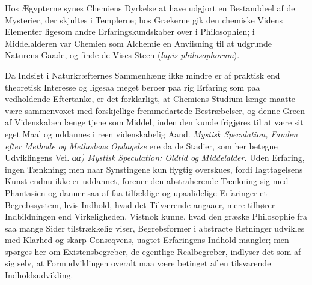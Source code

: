 \documentclass[12pt,a4paper]{book}
\begin{document}
Hos Ægypterne synes Chemiens Dyrkelse at have udgjort
en Bestanddeel af de Mysterier, der skjultes i Templerne;
hos Grækerne gik den chemiske Videns Elementer ligesom
andre Erfaringskundskaber over i Philosophien; i Middelalderen
var Chemien som Alchemie en Anviisning til at udgrunde
Naturens Gaade, og finde de Vises Steen (\textit{lapis
philosophorum}).

Da Indsigt i Naturkræfternes Sammenhæng ikke mindre
er af praktisk end theoretisk Interesse og ligesaa meget beroer
paa rig Erfaring som paa vedholdende Eftertanke, er det
forklarligt, at Chemiens Studium længe maatte være sammenvoxet
med forskjellige fremmedartede Bestræbelser, og denne
Green af Videnskaben længe tjene som Middel, inden den
kunde frigjøres til at være sit eget Maal og uddannes i reen
videnskabelig Aand. \emph{Mystisk Speculation, Famlen
efter Methode og Methodens Opdagelse} ere da de
Stadier, som her betegne Udviklingens Vei.
\emph{αα) Mystisk Speculation: Oldtid og Middelalder.}
Uden Erfaring, ingen Tænkning; men naar Synstingene
kun flygtig overskues, fordi Iagttagelsens Kunst endnu
ikke er uddannet, forener den abstraherende Tænkning sig med
Phantasien og danner saa af faa tilfældige og upaalidelige
Erfaringer et Begrebssystem, hvis Indhold, hvad det Tilværende
angaaer, mere tilhører Indbildningen end Virkeligheden.
Vistnok kunne, hvad den græske Philosophie fra saa
mange Sider tilstrækkelig viser, Begrebsformer i abstracte
Retninger udvikles med Klarhed og skarp Conseqvens, uagtet
Erfaringens Indhold mangler; men spørges her om Existensbegreber,
de egentlige Realbegreber, indlyser det som af sig
selv, at Formudviklingen overalt maa være betinget af en
tilsvarende Indholdsudvikling.
\end{document}
